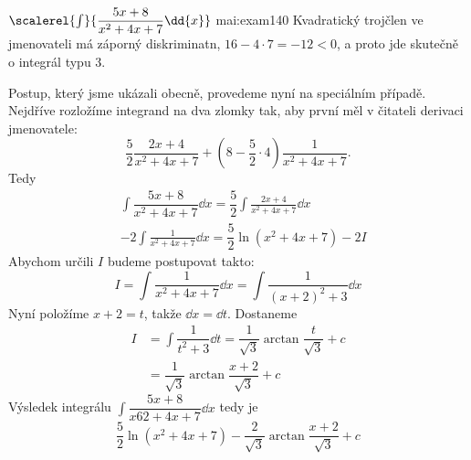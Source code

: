 \begin{mathexam}{\(\scalerel{\int}{\dfrac{5x+8}{x^2+4x+7}\dd{x}}\)
  \hfill\cite[s.~73]{Knichal}}{mai:exam140} 
  Kvadratický trojčlen ve jmenovateli má záporný diskriminatn, \(16-4\cdot7 = -12<0\), a proto jde
  skutečně o integrál typu 3.
  
  Postup, který jsme ukázali obecně, provedeme nyní na speciálním případě. Nejdříve rozložíme
  integrand na dva zlomky tak, aby první měl v čitateli derivaci jmenovatele: 
  \begin{equation*}
    \frac{5}{2}\frac{2x+4}{x^2+4x+7} + \left(8-\frac{5}{2}\cdot4\right)\frac{1}{x^2+4x+7}.
  \end{equation*}
  Tedy
  \begin{align*}
    & \int\dfrac{5x+8}{x^2+4x+7}\dd{x}  = \dfrac{5}{2}\int\frac{2x+4}{x^2+4x+7}\dd{x}  \\
    &-2\int\frac{1}{x^2+4x+7}\dd{x}     = \dfrac{5}{2}\ln(x^2+4x+7) - 2I
  \end{align*}
  Abychom určili \(I\) budeme postupovat takto:
  \begin{equation*}
    I = \int\dfrac{1}{x^2+4x+7}\dd{x} = \int\dfrac{1}{(x+2)^2+3}\dd{x} 
  \end{equation*}
  Nyní položíme \(x+2=t\), takže \(\dd{x}= \dd{t}\). Dostaneme
  \begin{align*}
    I &= \int\dfrac{1}{t^2+3}\dd{t} = \dfrac{1}{\sqrt{3}}\arctan\dfrac{t}{\sqrt{3}} + c \\
      &= \dfrac{1}{\sqrt{3}}\arctan\dfrac{x+2}{\sqrt{3}} + c
  \end{align*}
  Výsledek integrálu \(\int\dfrac{5x+8}{x62+4x+7}\dd{x}\) tedy je 
  \begin{equation*}
    \dfrac{5}{2}\ln(x^2+4x+7) - \dfrac{2}{\sqrt{3}}\arctan\dfrac{x+2}{\sqrt{3}} + c
  \end{equation*}
\end{mathexam}